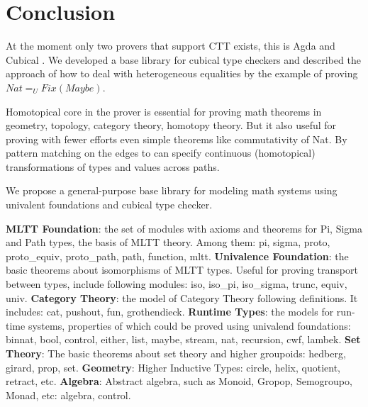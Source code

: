 \documentclass{svproc}
\begin{document}
\section{Conclusion}

At the moment only two provers that support CTT exists, this is Agda \cite{Ulf09} and Cubical \cite{Mortberg17}.
We developed a base library for cubical type checkers and described the approach
of how to deal with heterogeneous equalities by the example of proving $Nat =_U Fix(Maybe)$.

Homotopical core in the prover is essential for proving math theorems in geometry,
topology, category theory, homotopy theory. But it also useful
for proving with fewer efforts even simple theorems like commutativity of Nat. By pattern matching
on the edges to can specify continuous (homotopical) transformations of types
and values across paths.

We propose a general-purpose base library for modeling math systems using univalent foundations
and cubical type checker.

{\bf MLTT Foundation}:       the set of modules with axioms and theorems for Pi, Sigma and Path types,
                             the basis of MLTT theory. Among them: pi, sigma, proto, proto\_equiv,
                             proto\_path, path, function, mltt.
{\bf Univalence Foundation}: the basic theorems about isomorphisms of MLTT types. Useful for
                             proving transport between types, include following modules:
                             iso, iso\_pi, iso\_sigma, trunc, equiv, univ.
{\bf Category Theory}:       the model of Category Theory following \cite{HoTT} definitions. It includes:
                             cat, pushout, fun, grothendieck.
{\bf Runtime Types}:         the models for run-time systems, properties of which could be proved using
                             univalend foundations: binnat, bool, control, either, list,
                             maybe, stream, nat, recursion, cwf, lambek.
{\bf Set Theory}:            The basic theorems about set theory and higher groupoids: hedberg, girard, prop, set.
{\bf Geometry}:              Higher Inductive Types: circle, helix, quotient, retract, etc.
{\bf Algebra}:               Abstract algebra, such as Monoid, Gropop, Semogroupo, Monad,
                             etc: algebra, control.
\end{document}
